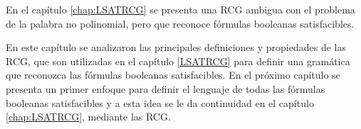 En el capítulo \ref{chap:LSATRCG} se presenta una RCG ambigua con el problema de la palabra no polinomial, 
pero que reconoce fórmulas booleanas satisfacibles.

En este capítulo se analizaron las principales definiciones y propiedades de las RCG, que son utilizadas en el capítulo \ref{LSATRCG} para definir una gramática que reconozca las fórmulas booleanas satisfacibles.  En el próximo capítulo se presenta un primer enfoque para definir el lenguaje de todas las fórmulas booleanas satisfacibles y a esta idea se le da continuidad en el capítulo \ref{chap:LSATRCG}, mediante las RCG.
